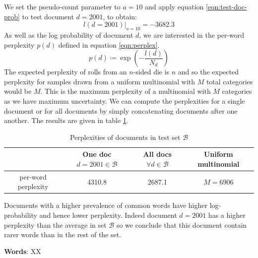 \documentclass[]{article}
\newcommand{\Bcal}{\mathcal{B}}
\begin{document}
 We set the pseudo-count parameter to $a=10$ and apply equation \ref{eqn:test-doc-prob} to test document $d=2001$, to obtain:
 \begin{equation}
 	l(d=2001)|_{a=10} = -3682.3
 \end{equation}
 As well as the log probability of document $d$, we are interested in the per-word perplexity $p(d)$ defined in equation \ref{eqn:perplex}.
%
\begin{equation}
p(d) \coloneqq \exp \left(- \frac{l(d)}{N_d} \right)
\label{eqn:perplex}
\end{equation}
%
The expected perplexity of rolls from an $n$-sided die is $n$ and so the expected perplexity for samples drawn from a uniform multinomial with $M$ total categories would be $M$. This is the maximum perplexity of a multinomial with $M$ categories as we have maximum uncertainty. We can compute the perplexities for a single document or for all documents by simply concatenating documents after one another. The results are given in table \ref{tab:perplex}.
%
\begin{table}[!h]
	\centering
	\begin{tabular}{c | c c c}
		& One doc $d=2001 \in \Bcal$ & All docs $\forall d \in \Bcal$ & Uniform multinomial \\ \hline
		per-word perplexity & 4310.8 & 2687.1 & $M=6906$
	\end{tabular}
\caption{Perplexities of documents in test set $\Bcal$}
\label{tab:perplex}
\end{table}
%
Documents with a higher prevalence of common words have higher log-probability and hence lower perplexity. Indeed document $d=2001$ has a higher perplexity than the average in set $\Bcal$ so we conclude that this document contain rarer words than in the rest of the set.

\textbf{Words}: XX
\end{document}
